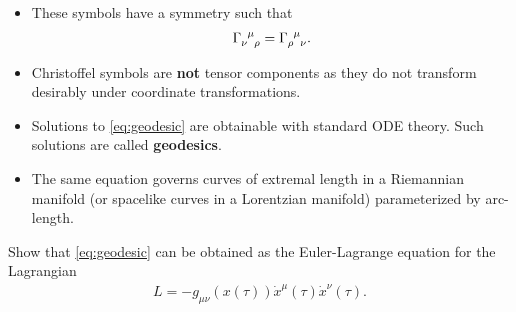 \begin{notes}~
    \begin{itemize}
        \item These symbols have a symmetry such that
        \begin{align}
            \tensor{\Gamma}{_{\nu}^{\mu}_\rho} = \tensor{\Gamma}{_{\rho}^{\mu}_\nu}
        .\end{align}
        
        \item Christoffel symbols are \textbf{not} tensor components as they do not transform desirably under coordinate transformations.
        
        \item Solutions to \cref{eq:geodesic} are obtainable with standard ODE theory. Such solutions are called \textbf{geodesics}.
        
        \item The same equation governs curves of extremal length in a Riemannian manifold (or spacelike curves in a Lorentzian manifold) parameterized by arc-length.
    \end{itemize}
\end{notes}

\begin{exercise}
    Show that \cref{eq:geodesic} can be obtained as the Euler-Lagrange equation for the Lagrangian
    \begin{align}
        L = - g_{\mu \nu} \left( x \left( \tau \right)  \right) \dot{x}^{\mu} \left( \tau \right)  \dot{x}^{\nu} \left( \tau \right) 
    .\end{align}
\end{exercise}

